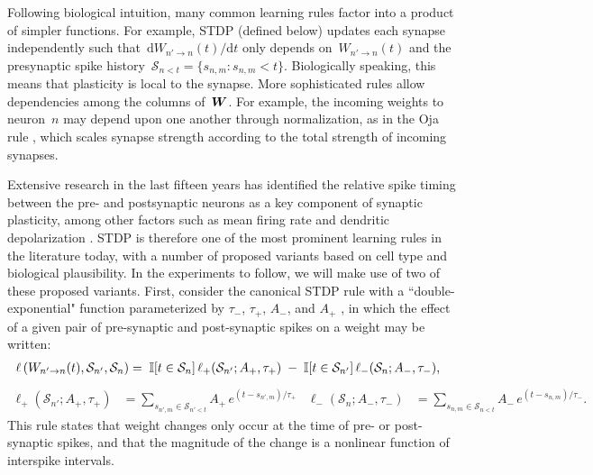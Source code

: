 Following biological intuition, many common learning rules factor into
a product of simpler functions. For example, STDP (defined below)
updates each synapse independently such that~${\mathrm{d}W_{n' \to
    n}(t)/\mathrm{d}t}$ only depends on~${W_{n'\to n}(t)}$ and the
presynaptic spike history~${\mathcal{S}_{n<t}=\{s_{n,m} : s_{n,m} <
  t\}}$. Biologically speaking, this means that plasticity is local to
the synapse. More sophisticated rules allow dependencies among the
columns of~$\boldsymbol{W}$. For example, the incoming weights to neuron~$n$ may
depend upon one another through normalization, as in the Oja rule
\cite{Oja-1982}, which scales synapse strength according to the total
strength of incoming synapses.

Extensive research in the last fifteen years has identified the
relative spike timing between the pre- and postsynaptic neurons as a
key component of synaptic plasticity, among other factors such as mean
firing rate and dendritic depolarization \cite{Feldman-2012}. STDP is
therefore one of the most prominent learning rules in the literature
today, with a number of proposed variants based on cell type and
biological plausibility. In the experiments to follow, we will make
use of two of these proposed variants. First, consider the canonical
STDP rule with a ``double-exponential" function parameterized by
$\tau_-$, $\tau_+$, $A_-$, and $A_+$ \cite{Song-2000}, in which the
effect of a given pair of pre-synaptic and post-synaptic spikes on a
weight may be written:
\begin{align}
\label{eqn:AddSTDP}
 \ell\left(W_{n' \to n}(t), \mathcal{S}_{n'}, \mathcal{S}_{n} \right) &= 
 \;\mathbb{I}[t \in \mathcal{S}_{n}]\, \ell_+(\mathcal{S}_{n'}; A_+, \tau_+) 
 \;-\;\mathbb{I}[t \in \mathcal{S}_{n'}]\, \ell_-(\mathcal{S}_{n}; A_-, \tau_-),
\end{align}
\begin{align*}
\ell_+(\mathcal{S}_{n'}; A_+, \tau_+) &= \sum_{s_{n',m}\in \mathcal{S}_{n'<t}}  A_+\,e^{(t-s_{n',m})/ \tau_+} &
\ell_-(\mathcal{S}_{n}; A_-, \tau_-) &= \sum_{s_{n,m}\in \mathcal{S}_{n<t}} A_-\,e^{(t-s_{n,m})/\tau_-}.
\end{align*}
This rule states that weight changes only occur at the time of pre- or
post-synaptic spikes, and that the magnitude of the change is a
nonlinear function of interspike intervals.

